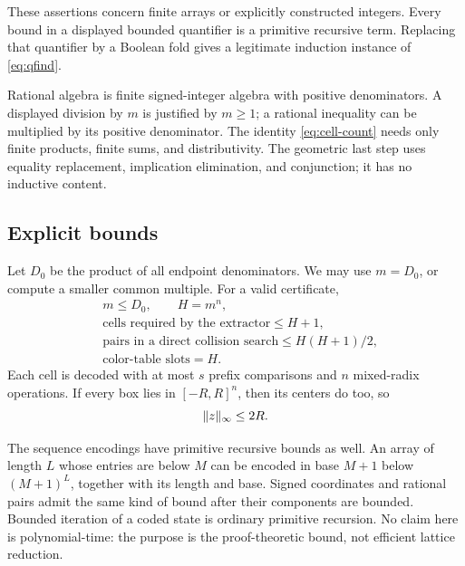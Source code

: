 These assertions concern finite arrays or explicitly
constructed integers. Every bound in a displayed bounded
quantifier is a primitive recursive term. Replacing that
quantifier by a Boolean fold gives a legitimate induction
instance of \cref{eq:qfind}.

Rational algebra is finite signed-integer algebra with
positive denominators. A displayed division by \(m\) is
justified by \(m\geq1\); a rational inequality can be
multiplied by its positive denominator. The identity
\cref{eq:cell-count} needs only finite products, finite
sums, and distributivity. The geometric last step uses
equality replacement, implication elimination, and
conjunction; it has no inductive content.

\subsection{Explicit bounds}

Let \(D_0\) be the product of all endpoint denominators.
We may use \(m=D_0\), or compute a smaller common multiple.
For a valid certificate,
\begin{align*}
 &m\leq D_0,\qquad H=m^n,\\
 &\text{cells required by the extractor}\leq H+1,\\
 &\text{pairs in a direct collision search}\leq H(H+1)/2,\\
 &\text{color-table slots}=H.
\end{align*}
Each cell is decoded with at most \(s\) prefix comparisons
and \(n\) mixed-radix operations. If every box lies in
\([-R,R]^n\), then its centers do too, so
\begin{equation}\label{eq:coefficient-bound}
                              \lVert z\rVert_\infty\leq2R.
\end{equation}

The sequence encodings have primitive recursive bounds as
well. An array of length \(L\) whose entries are below \(M\)
can be encoded in base \(M+1\) below \((M+1)^L\), together
with its length and base. Signed coordinates and rational
pairs admit the same kind of bound after their components
are bounded. Bounded iteration of a coded state is ordinary
primitive recursion. No claim here is polynomial-time:
the purpose is the proof-theoretic bound, not efficient
lattice reduction.
